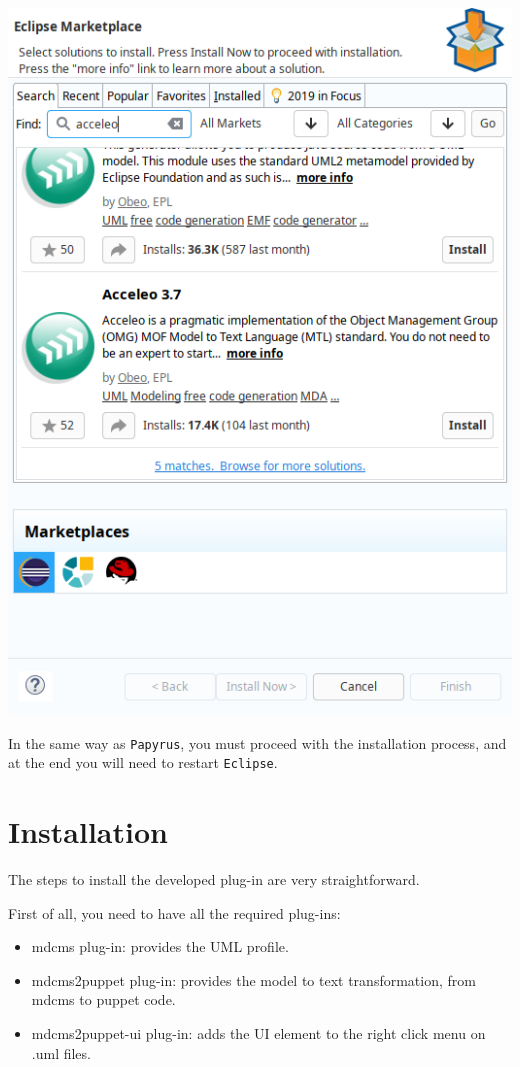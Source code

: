 \documentclass[11pt]{article}
\begin{document}
\begin{center}
\includegraphics[width=.9\linewidth]{images/acceleo.png}
\end{center}

In the same way as \texttt{Papyrus}, you must proceed with the installation process, and at the end you will need to restart \texttt{Eclipse}.

\section{Installation}
\label{sec:orgb6f475c}

The steps to install the developed plug-in are very straightforward.

First of all, you need to have all the required plug-ins:

\begin{itemize}
\item mdcms plug-in: provides the UML profile.
\item mdcms2puppet plug-in: provides the model to text transformation, from mdcms to puppet code.
\item mdcms2puppet-ui plug-in: adds the UI element to the right click menu on .uml files.
\end{itemize}
\end{document}
